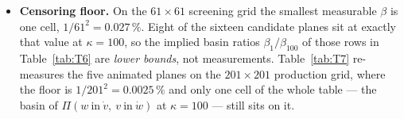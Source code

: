 \documentclass[10pt]{article}
\begin{document}
\begin{itemize}[leftmargin=1.4em, itemsep=1pt]
exactly oppositely; a value above $1$ therefore means the ranking has \emph{inverted} --- points that
$\kappa=1$ prefers, $\kappa=100$ rejects.
\item \textbf{Censoring floor.} On the $61\times61$ screening grid the smallest measurable $\beta$ is
one cell, $1/61^2=0.027\,\%$. Eight of the sixteen candidate planes sit at exactly that value at
$\kappa=100$, so the implied basin ratios $\beta_1/\beta_{100}$ of those rows in Table~\ref{tab:T6} are
\emph{lower bounds}, not measurements. Table~\ref{tab:T7} re-measures the five animated planes on the
$201\times201$ production grid, where the floor is $1/201^2=0.0025\,\%$ and only one cell of the whole
table --- the basin of $\Pi(w\ \text{in}\ \dot v,\ v\ \text{in}\ \dot w)$ at $\kappa=100$ --- still
sits on it.
\end{itemize}
\end{document}
